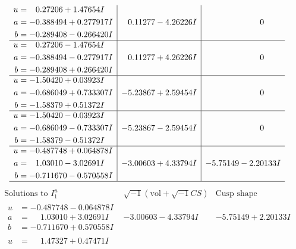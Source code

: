 \documentclass[1p]{elsarticle_modified}
\theoremstyle{definition}
\newcommand{\I}{\sqrt{-1}}
\begin{document}
$$\begin{array}{c|c|c}
\begin{aligned}
u &= \phantom{-}0.27206 + 1.47654 I \\
a &= -0.388494 + 0.277917 I \\
b &= -0.289408 - 0.266420 I\end{aligned}
 & \phantom{-}0.11277 - 4.26226 I & \phantom{-0.000000 } 0 \\ \hline\begin{aligned}
u &= \phantom{-}0.27206 - 1.47654 I \\
a &= -0.388494 - 0.277917 I \\
b &= -0.289408 + 0.266420 I\end{aligned}
 & \phantom{-}0.11277 + 4.26226 I & \phantom{-0.000000 } 0 \\ \hline\begin{aligned}
u &= -1.50420 + 0.03923 I \\
a &= -0.686049 + 0.733307 I \\
b &= -1.58379 + 0.51372 I\end{aligned}
 & -5.23867 + 2.59454 I & \phantom{-0.000000 } 0 \\ \hline\begin{aligned}
u &= -1.50420 - 0.03923 I \\
a &= -0.686049 - 0.733307 I \\
b &= -1.58379 - 0.51372 I\end{aligned}
 & -5.23867 - 2.59454 I & \phantom{-0.000000 } 0 \\ \hline\begin{aligned}
u &= -0.487748 + 0.064878 I \\
a &= \phantom{-}1.03010 - 3.02691 I \\
b &= -0.711670 - 0.570558 I\end{aligned}
 & -3.00603 + 4.33794 I & -5.75149 - 2.20133 I\\
 \hline 
 \end{array}$$\newpage$$\begin{array}{c|c|c}  
\text{Solutions to }I^u_{1}& \I (\text{vol} + \sqrt{-1}CS) & \text{Cusp shape}\\
 \hline 
\begin{aligned}
u &= -0.487748 - 0.064878 I \\
a &= \phantom{-}1.03010 + 3.02691 I \\
b &= -0.711670 + 0.570558 I\end{aligned}
 & -3.00603 - 4.33794 I & -5.75149 + 2.20133 I \\ \hline\begin{aligned}
u &= \phantom{-}1.47327 + 0.47471 I \\

\end{aligned}
\end{array}$$
\end{document}

